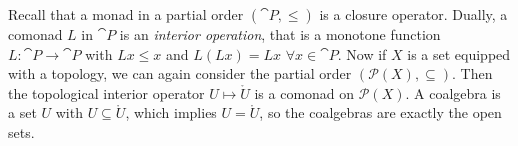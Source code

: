 \begin{example}[Topology]
    Recall that a monad in a partial order $(\cat{P},\leq)$ is a closure operator.
    Dually, a comonad $L$ in $\cat{P}$ is an \textit{interior operation}, that is a 
    monotone function $L \colon \cat{P} \to \cat{P}$ with $Lx \leq x$ and $L(Lx)=Lx$ $\forall x \in \cat{P}$.
    Now if $X$ is a set equipped with a topology, we can again consider the partial order
    $(\mathcal{P}(X),\subseteq)$.
    Then the topological interior operator $U \mapsto \mathring{U}$ is a comonad on $\mathcal{P}(X)$. 
    A coalgebra is a set $U$ with $U \subseteq \mathring{U}$, which implies $U = \mathring{U}$,
    so the coalgebras are exactly the open sets.
\end{example}